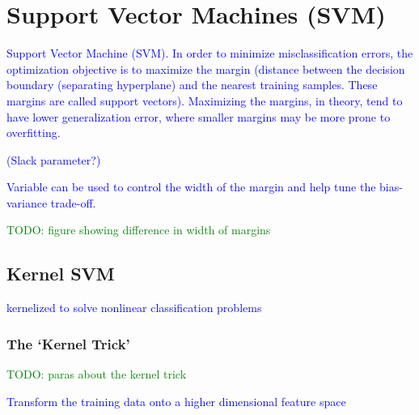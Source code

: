 \section{Support Vector Machines (SVM)}

\textcolor{blue}{Support Vector Machine (SVM). In order to minimize misclassification errors, the optimization objective is to maximize the margin (distance between the decision boundary (separating hyperplane) and the nearest training samples. These margins are called support vectors). Maximizing the margins, in theory, tend to have lower generalization error, where smaller margins may be more prone to overfitting.}

\textcolor{blue}{(Slack parameter?)}

\textcolor{blue}{Variable can be used to control the width of the margin and help tune the bias-variance trade-off.}

\textcolor{green}{TODO: figure showing difference in width of margins}

\subsection{Kernel SVM}

\textcolor{blue}{kernelized to solve nonlinear classification problems}

\subsubsection{The `Kernel Trick'}

\textcolor{green}{TODO: paras about the kernel trick}

\textcolor{blue}{Transform the training data onto a higher dimensional feature space}